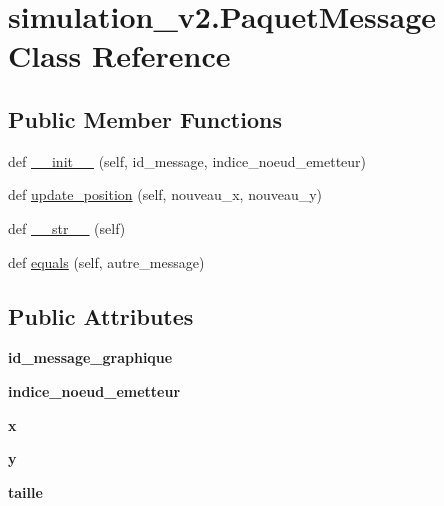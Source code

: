 \hypertarget{classsimulation__v2_1_1PaquetMessage}{}\section{simulation\+\_\+v2.\+Paquet\+Message Class Reference}
\label{classsimulation__v2_1_1PaquetMessage}
\subsection*{Public Member Functions}
\begin{DoxyCompactItemize}
\item 
def \hyperlink{classsimulation__v2_1_1PaquetMessage_ae1faf6dce1956cb78d4596e989759fd7}{\+\_\+\+\_\+init\+\_\+\+\_\+} (self, id\+\_\+message, indice\+\_\+noeud\+\_\+emetteur)
\item 
def \hyperlink{classsimulation__v2_1_1PaquetMessage_a9a4d5c97ecb3e51512d35516e1e0b274}{update\+\_\+position} (self, nouveau\+\_\+x, nouveau\+\_\+y)
\item 
def \hyperlink{classsimulation__v2_1_1PaquetMessage_a3f1d561adb996726291e6c05a2c63602}{\+\_\+\+\_\+str\+\_\+\+\_\+} (self)
\item 
def \hyperlink{classsimulation__v2_1_1PaquetMessage_a0cf801915994d2b32d7aa0ca2dc42f32}{equals} (self, autre\+\_\+message)
\end{DoxyCompactItemize}
\subsection*{Public Attributes}
\begin{DoxyCompactItemize}
\item 
{\bfseries id\+\_\+message\+\_\+graphique}\hypertarget{classsimulation__v2_1_1PaquetMessage_aeea1e4c55772d3f6c9fd75424b14c5cd}{}\label{classsimulation__v2_1_1PaquetMessage_aeea1e4c55772d3f6c9fd75424b14c5cd}

\item 
{\bfseries indice\+\_\+noeud\+\_\+emetteur}\hypertarget{classsimulation__v2_1_1PaquetMessage_a5fd06b03aaed5b19d1048ee5155b4332}{}\label{classsimulation__v2_1_1PaquetMessage_a5fd06b03aaed5b19d1048ee5155b4332}

\item 
{\bfseries x}\hypertarget{classsimulation__v2_1_1PaquetMessage_a8443738c33691b3871e4a37b4c5b493f}{}\label{classsimulation__v2_1_1PaquetMessage_a8443738c33691b3871e4a37b4c5b493f}

\item 
{\bfseries y}\hypertarget{classsimulation__v2_1_1PaquetMessage_aa7f5cc48e1169cc3d43d90e354011cf1}{}\label{classsimulation__v2_1_1PaquetMessage_aa7f5cc48e1169cc3d43d90e354011cf1}

\item 
{\bfseries taille}\hypertarget{classsimulation__v2_1_1PaquetMessage_afe73717dc7f514968b1cb7cb2cbc387b}{}\label{classsimulation__v2_1_1PaquetMessage_afe73717dc7f514968b1cb7cb2cbc387b}

\end{DoxyCompactItemize}


